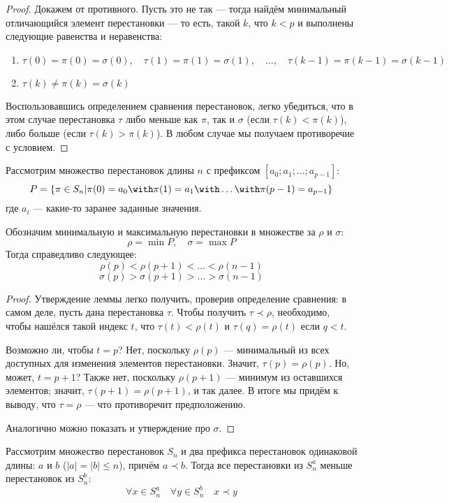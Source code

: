 \documentclass[12pt,a4paper,oneside]{article}
\begin{document}
\begin{proof}
Докажем от противного. Пусть это не так --- тогда найдём минимальный
отличающийся элемент перестановки --- то есть, такой $k$, что $k<p$ и выполнены 
следующие равенства и неравенства:
\begin{enumerate}
\item $\tau(0) = \pi(0) = \sigma(0),\quad \tau(1) = \pi(1) =\sigma(1),\quad\dots,\quad \tau(k-1) = \pi(k-1) = \sigma(k-1)$
\item $\tau(k)\ne\pi(k)=\sigma(k)$
\end{enumerate}
Воспользовавшись определением сравнения перестановок, легко убедиться, 
что в этом случае перестановка $\tau$ либо меньше как
$\pi$, так и $\sigma$ (если $\tau(k) < \pi(k)$), либо больше 
(если $\tau(k) > \pi(k)$). В любом случае мы получаем противоречие с условием.
\end{proof}


\begin{lemma}
Рассмотрим множество перестановок длины $n$ с префиксом $[a_0; a_1; \dots; a_{p-1}]$:
$$P = \{\pi\in S_n | \pi(0)=a_0 \with \pi(1)=a_1 \with\dots\with \pi(p-1)=a_{p-1}\}$$
где $a_i$ --- какие-то заранее заданные значения.

Обозначим минимальную и максимальную перестановки в множестве за $\rho$ и $\sigma$:
$$\rho = \min P, \quad \sigma = \max P$$
Тогда справедливо следующее:
$$\rho(p) < \rho(p+1) < \dots < \rho(n-1)$$
$$\sigma(p) > \sigma(p+1) > \dots > \sigma(n-1)$$
\end{lemma}

\begin{proof}
Утверждение леммы легко получить, проверив определение сравнения: в самом деле,
пусть дана перестановка $\tau$. Чтобы получить $\tau\prec\rho$, необходимо, чтобы
нашёлся такой индекс $t$, что $\tau(t) < \rho(t)$ и $\tau(q) = \rho(t)$ если $q < t$.

Возможно ли, чтобы $t = p$? Нет, поскольку $\rho(p)$ --- минимальный из всех доступных
для изменения элементов перестановки. Значит, $\tau(p) = \rho(p)$. Но, может,
$t = p+1$? Также нет, поскольку $\rho(p+1)$ --- минимум из оставшихся элементов;
значит, $\tau(p+1) = \rho(p+1)$, и так далее. В итоге мы придём к выводу, что 
$\tau = \rho$ --- что противоречит предположению.

Аналогично можно показать и утверждение про $\sigma$.
\end{proof}

\begin{lemma}
Рассмотрим множество перестановок $S_n$ и два префикса перестановок одинаковой
длины: $a$ и $b$ ($|a| = |b| \le n$), причём $a \prec b$. Тогда все перестановки 
из $S^a_n$ меньше перестановок из $S^b_n$: $$\forall x\in S^a_n\quad\forall y\in S^b_n\quad x \prec y$$
\end{lemma}
\end{document}
